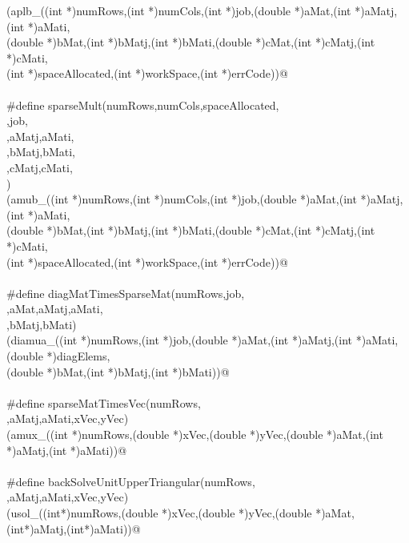 \documentclass[12pt]{article}
\begin{document}
\begin{flushleft}
\begin{minipage}{\linewidth}
\begin{list}{}{}
\mbox{}\verb@(aplb_((int *)numRows,(int *)numCols,(int *)job,(double  *)aMat,(int *)aMatj,(int *)aMati, \@\\
\mbox{}\verb@(double *)bMat,(int *)bMatj,(int *)bMati,(double *)cMat,(int *)cMatj,(int *)cMati, \@\\
\mbox{}\verb@(int *)spaceAllocated,(int *)workSpace,(int *)errCode))@\\
\mbox{}\verb@@\\
\mbox{}\verb@#define sparseMult(numRows,numCols,spaceAllocated, \@\\
\mbox{}\verb@workSpace,job, \@\\
\mbox{}\verb@aMat,aMatj,aMati, \@\\
\mbox{}\verb@bMat,bMatj,bMati, \@\\
\mbox{}\verb@cMat,cMatj,cMati, \@\\
\mbox{}\verb@errCode) \@\\
\mbox{}\verb@(amub_((int *)numRows,(int *)numCols,(int *)job,(double *)aMat,(int *)aMatj,(int *)aMati, \@\\
\mbox{}\verb@(double *)bMat,(int *)bMatj,(int *)bMati,(double *)cMat,(int *)cMatj,(int *)cMati, \@\\
\mbox{}\verb@(int *)spaceAllocated,(int *)workSpace,(int *)errCode))@\\
\mbox{}\verb@@\\
\mbox{}\verb@#define diagMatTimesSparseMat(numRows,job, \@\\
\mbox{}\verb@diagElems,aMat,aMatj,aMati, \@\\
\mbox{}\verb@bMat,bMatj,bMati) \@\\
\mbox{}\verb@(diamua_((int *)numRows,(int *)job,(double *)aMat,(int *)aMatj,(int *)aMati,(double *)diagElems, \@\\
\mbox{}\verb@(double *)bMat,(int *)bMatj,(int *)bMati))@\\
\mbox{}\verb@@\\
\mbox{}\verb@#define sparseMatTimesVec(numRows, \@\\
\mbox{}\verb@aMat,aMatj,aMati,xVec,yVec) \@\\
\mbox{}\verb@(amux_((int *)numRows,(double *)xVec,(double *)yVec,(double *)aMat,(int *)aMatj,(int *)aMati))@\\
\mbox{}\verb@@\\
\mbox{}\verb@#define backSolveUnitUpperTriangular(numRows, \@\\
\mbox{}\verb@aMat,aMatj,aMati,xVec,yVec) \@\\
\mbox{}\verb@(usol_((int*)numRows,(double *)xVec,(double *)yVec,(double *)aMat,(int*)aMatj,(int*)aMati))@\\

\end{list}
\end{minipage}
\end{flushleft}
\end{document}
